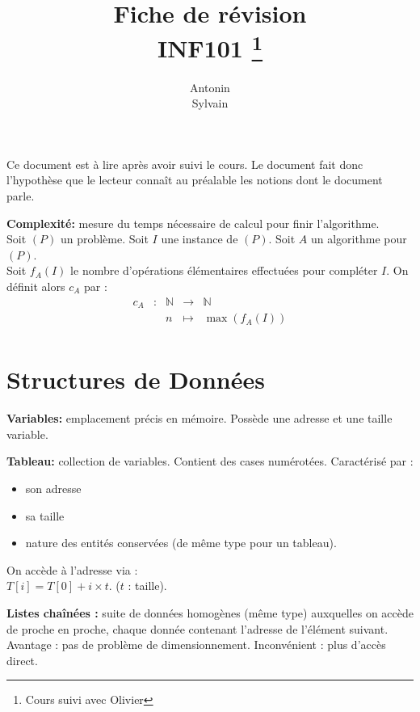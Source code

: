 \documentclass[a4paper, 8pt]{article}
\title{\sffamily\textbf{Fiche de révision \\ INF101} \thanks{Cours suivi avec Olivier \bsc{Hudry} }}
\author{Antonin \bsc{Godard}\\Sylvain \bsc{Rager}}
\begin{document}
\renewcommand{\labelitemii}{$\bullet$}

\begin{multicols*}{3}
\setlength{\parindent}{0pt}
\maketitle

\begin{changemargin}{0.5cm}{0.5cm} 
{\footnotesize Ce document est à lire après avoir suivi le cours. Le document fait donc l'hypothèse que le lecteur connaît au préalable les notions dont le document parle.}
\end{changemargin}


\textbf{Complexité:} mesure du temps nécessaire de calcul pour finir l'algorithme.\\ Soit $(P)$ un problème. Soit $I$ une instance de $(P)$. Soit $A$ un algorithme pour $(P)$.\\ Soit $f_A(I)$ le nombre d'opérations élémentaires effectuées pour compléter $I$. On définit alors $c_A$ par :
\[
\begin{array}{cc|ccl}
c_A & : & \mathbb{N} & \to & \mathbb{N} \\
 & & n & \mapsto & \max(f_A(I)) \\
\end{array}
\]

\section*{Structures de Données}

\textbf{Variables:} emplacement précis en mémoire. Possède une adresse et une taille variable.

\textbf{Tableau:} collection de variables. Contient des cases numérotées. Caractérisé par :\begin{itemize}
\item son adresse
\item sa taille
\item nature des entités conservées (de même type pour un tableau).
\end{itemize}
On accède à l'adresse via :\\ $ T\left[ i\right] = T\left[ 0\right] + i\times t $. ($t$ : taille).

\textbf{Listes chaînées :} suite de données homogènes (même type) auxquelles on accède de proche en proche, chaque donnée contenant l'adresse de l'élément suivant. Avantage : pas de problème de dimensionnement. Inconvénient : plus d'accès direct.


\end{multicols*}
\end{document}
